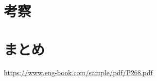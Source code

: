 \documentclass{jarticle}
\begin{document}
\section{考察}



\section{まとめ}



\begin{thebibliography}{99}

   \url{https://www.eng-book.com/sample/pdf/P268.pdf}

\end{thebibliography}
\end{document}
